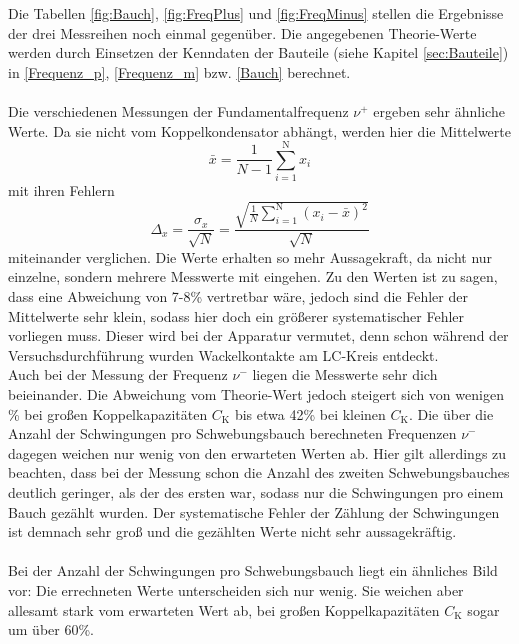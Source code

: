 Die Tabellen \ref{fig:Bauch}, \ref{fig:FreqPlus} und \ref{fig:FreqMinus} stellen die Ergebnisse der drei Messreihen noch einmal gegenüber. Die angegebenen Theorie-Werte werden durch Einsetzen der Kenndaten der Bauteile (siehe Kapitel \ref{sec:Bauteile}) in \eqref{Frequenz_p}, \eqref{Frequenz_m} bzw. \eqref{Bauch} berechnet. \\
\ \\
Die verschiedenen Messungen der Fundamentalfrequenz $\nu^+$ ergeben sehr ähnliche Werte. Da sie nicht vom Koppelkondensator abhängt, werden hier die Mittelwerte
\[ \bar{x} = \frac{1}{N-1} \sum_{i=1}^\text{N} x_i \]
mit ihren Fehlern
\[ \Delta_{x} = \frac{\sigma_x}{\sqrt{N}} = \frac{\sqrt{\frac{1}{N} \sum_{i=1}^\text{N} (x_i - \bar{x})^2}}{\sqrt{N}} \]
miteinander verglichen. Die Werte erhalten so mehr Aussagekraft, da nicht nur einzelne, sondern mehrere Messwerte mit eingehen. Zu den Werten ist zu sagen, dass eine Abweichung von 7-8\% vertretbar wäre, jedoch sind die Fehler der Mittelwerte sehr klein, sodass hier doch ein größerer systematischer Fehler vorliegen muss. Dieser wird bei der Apparatur vermutet, denn schon während der Versuchsdurchführung wurden Wackelkontakte am LC-Kreis entdeckt.
 \\
Auch bei der Messung der Frequenz $\nu^-$ liegen die Messwerte sehr dich beieinander. Die Abweichung vom Theorie-Wert jedoch steigert sich von wenigen \% bei großen Koppelkapazitäten $C_\text{K}$ bis etwa 42\% bei kleinen $C_\text{K}$. Die über die Anzahl der Schwingungen pro Schwebungsbauch berechneten Frequenzen $\nu^-$ dagegen weichen nur wenig von den erwarteten Werten ab. Hier gilt allerdings zu beachten, dass bei der Messung schon die Anzahl des zweiten Schwebungsbauches deutlich geringer, als der des ersten war, sodass nur die Schwingungen pro einem Bauch gezählt wurden. Der systematische Fehler der Zählung der Schwingungen ist demnach sehr groß und die gezählten Werte nicht sehr aussagekräftig. \\
 \\
Bei der Anzahl der Schwingungen pro Schwebungsbauch liegt ein ähnliches Bild vor: Die errechneten Werte unterscheiden sich nur wenig. Sie weichen aber allesamt stark vom erwarteten Wert ab, bei großen Koppelkapazitäten $C_\text{K}$ sogar um über 60\%.

